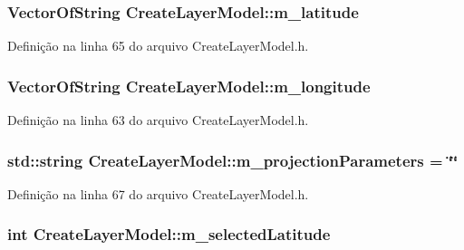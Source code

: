 \subsubsection[{m\+\_\+latitude}]{\setlength{\rightskip}{0pt plus 5cm}Vector\+Of\+String Create\+Layer\+Model\+::m\+\_\+latitude\hspace{0.3cm}{\ttfamily [protected]}}\label{class_create_layer_model_a0ced30e07e66592178c4bf22de6b1764}


Definição na linha 65 do arquivo Create\+Layer\+Model.\+h.

\subsubsection[{m\+\_\+longitude}]{\setlength{\rightskip}{0pt plus 5cm}Vector\+Of\+String Create\+Layer\+Model\+::m\+\_\+longitude\hspace{0.3cm}{\ttfamily [protected]}}\label{class_create_layer_model_a16386ecbb7cd0567776a23b9242238f1}


Definição na linha 63 do arquivo Create\+Layer\+Model.\+h.

\subsubsection[{m\+\_\+projection\+Parameters}]{\setlength{\rightskip}{0pt plus 5cm}std\+::string Create\+Layer\+Model\+::m\+\_\+projection\+Parameters = \char`\"{}\char`\"{}\hspace{0.3cm}{\ttfamily [protected]}}\label{class_create_layer_model_ac4882ea0712229f67710641058b257af}


Definição na linha 67 do arquivo Create\+Layer\+Model.\+h.

\subsubsection[{m\+\_\+selected\+Latitude}]{\setlength{\rightskip}{0pt plus 5cm}int Create\+Layer\+Model\+::m\+\_\+selected\+Latitude\hspace{0.3cm}{\ttfamily [protected]}}\label{class_create_layer_model_af997d3ccc2feb55902bc57bd012023ac}


